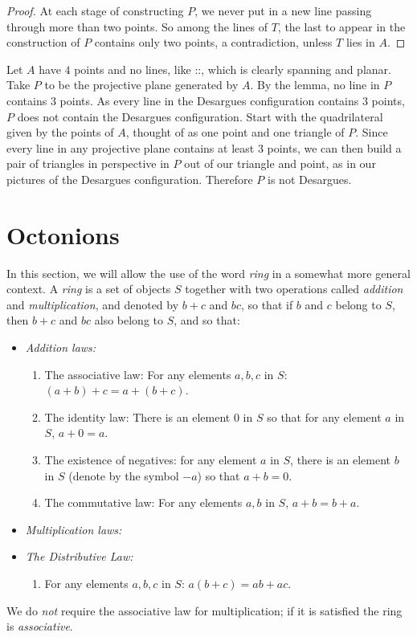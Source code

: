 \begin{proof}
At each stage of constructing \(P\), we never put in a new line passing through more than two points.
So among the lines of \(T\), the last to appear in the construction of \(P\) contains only two points, a contradiction, unless \(T\) lies in \(A\).
\end{proof}
\begin{example}
Let \(A\) have \(4\) points and no lines, like ::, which is clearly spanning and planar. 
Take \(P\) to be the projective plane generated by \(A\).
By the lemma, no line in \(P\) contains \(3\) points.
As every line in the Desargues configuration contains \(3\) points, \(P\) does not contain the Desargues configuration.
Start with the quadrilateral given by the points of \(A\), thought of as one point and one triangle of \(P\).
Since every line in any projective plane contains at least \(3\) points, we can then build a pair of triangles in perspective in \(P\) out of our triangle and point, as in our pictures of the Desargues configuration.
Therefore \(P\) is not Desargues. 
\end{example}
\section{Octonions}
In this section, we will allow the use of the word \emph{ring} in a somewhat more general context.
A \emph{ring} is a set of objects \(S\) together with two operations called \emph{addition} and \emph{multiplication}, and denoted by \(b+c\) and \(bc\), so that if \(b\) and \(c\) belong to \(S\), then \(b+c\) and \(bc\) also belong to \(S\), and so that:
\smallskip
\begin{itemize}
\item[]\emph{Addition laws:}
\begin{enumerate}
\item The associative law: For any elements \(a, b, c\) in \(S\): \((a+b)+c=a+(b+c)\).
\item The identity law: There is an element \(0\) in \(S\) so that for any element \(a\) in \(S\), \(a+0=a\).
\item The existence of negatives: for any element \(a\) in \(S\), there is an element \(b\) in \(S\) (denote by the symbol \(-a\)) so that \(a+b=0\).
\item The commutative law: For any elements \(a, b\) in \(S\), \(a+b=b+a\).
\end{enumerate}
\smallskip
\item[]\emph{Multiplication laws:}
\item[]\emph{The Distributive Law:}
\begin{enumerate}
\item For any elements \(a, b, c\) in \(S\): \(a(b+c)=ab+ac\).
\end{enumerate}
\end{itemize}
We do \emph{not} require the associative law for multiplication; if it is satisfied the ring is \emph{associative}.

